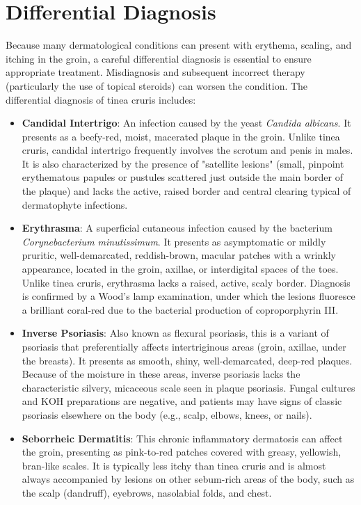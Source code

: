\section*{Differential Diagnosis}
Because many dermatological conditions can present with erythema, scaling, and itching in the groin, a careful differential diagnosis is essential to ensure appropriate treatment. Misdiagnosis and subsequent incorrect therapy (particularly the use of topical steroids) can worsen the condition.
The differential diagnosis of tinea cruris includes:
\begin{itemize}
    \item \textbf{Candidal Intertrigo}: An infection caused by the yeast \textit{Candida albicans}. It presents as a beefy-red, moist, macerated plaque in the groin. Unlike tinea cruris, candidal intertrigo frequently involves the scrotum and penis in males. It is also characterized by the presence of "satellite lesions" (small, pinpoint erythematous papules or pustules scattered just outside the main border of the plaque) and lacks the active, raised border and central clearing typical of dermatophyte infections.
    \item \textbf{Erythrasma}: A superficial cutaneous infection caused by the bacterium \textit{Corynebacterium minutissimum}. It presents as asymptomatic or mildly pruritic, well-demarcated, reddish-brown, macular patches with a wrinkly appearance, located in the groin, axillae, or interdigital spaces of the toes. Unlike tinea cruris, erythrasma lacks a raised, active, scaly border. Diagnosis is confirmed by a Wood's lamp examination, under which the lesions fluoresce a brilliant coral-red due to the bacterial production of coproporphyrin III.
    \item \textbf{Inverse Psoriasis}: Also known as flexural psoriasis, this is a variant of psoriasis that preferentially affects intertriginous areas (groin, axillae, under the breasts). It presents as smooth, shiny, well-demarcated, deep-red plaques. Because of the moisture in these areas, inverse psoriasis lacks the characteristic silvery, micaceous scale seen in plaque psoriasis. Fungal cultures and KOH preparations are negative, and patients may have signs of classic psoriasis elsewhere on the body (e.g., scalp, elbows, knees, or nails).
    \item \textbf{Seborrheic Dermatitis}: This chronic inflammatory dermatosis can affect the groin, presenting as pink-to-red patches covered with greasy, yellowish, bran-like scales. It is typically less itchy than tinea cruris and is almost always accompanied by lesions on other sebum-rich areas of the body, such as the scalp (dandruff), eyebrows, nasolabial folds, and chest.

\end{itemize}
